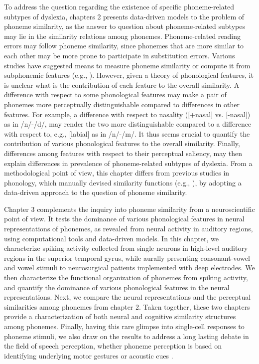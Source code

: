 To address the question regarding the existence of specific phoneme-related subtypes of dyslexia, chapters 2 presents data-driven models to the problem of phoneme similarity, as the answer to question about phoneme-related subtypes may lie in the similarity relations among phonemes. Phoneme-related reading errors may follow phoneme similarity, since phonemes that are more similar to each other may be more prone to participate in substitution errors. Various studies have suggested means to measure phoneme similarity \citep{NicelyMiller1955} or compute it from subphonemic features (e.g., \citealp{Pierrehumbert1993}). However, given a theory of phonological features, it is unclear what is the contribution of each feature to the overall similarity. A difference with respect to some phonological features may make a pair of phonemes more perceptually distinguishable compared to differences in other features. For example, a difference with respect to nasality ([+nasal] vs. [-nasal]) as in /n/-/d/, may render the two more distinguishable compared to a difference with respect to, e.g., [labial] as in /n/-/m/. It thus seems crucial to quantify the contribution of various phonological features to the overall similarity. Finally, differences among features with respect to their perceptual saliency, may then explain differences in prevalence of phoneme-related subtypes of dyslexia. From a methodological point of view, this chapter differs from previous studies in phonology, which manually devised similarity functions (e.g., \citealp{Frisch1997}), by adopting a data-driven approach to the question of phoneme similarity.

Chapter 3 complements the inquiry into phoneme similarity from a neuroscientific point of view. It tests the dominance of various phonological features in neural representations of phonemes, as revealed from neural activity in auditory regions, using computational tools and data-driven models. In this chapter, we characterize spiking activity collected from single neurons in high-level auditory regions in the superior temporal gyrus, while aurally presenting consonant-vowel and vowel stimuli to neurosurgical patients implemented with deep electrodes. We then characterize the functional organization of phonemes from spiking activity, and quantify the dominance of various phonological features in the neural representations. Next, we compare the neural representations and the perceptual similarities among phonemes from chapter 2. Taken together, these two chapters provide a characterization of both neural and cognitive similarity structures among phonemes. Finally, having this rare glimpse into single-cell responses to phoneme stimuli, we also draw on the results to address a long lasting debate in the field of speech perception, whether phoneme perception is based on identifying underlying motor gestures \citep{liberman1967perception, liberman1985motor} or acoustic cues \citep{stevens1972quantal, stevens1989quantal}.